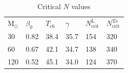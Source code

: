 \begin{table}
\centering
\caption{Critical $N$ values}
\begin{tabular}{llllll}
\hline\noalign{\smallskip}
${\mathrm M}_\odot$ & $\beta_{0}$ & $T_{\mathrm c6}$ & $\gamma$
& $N_{\mathrm{crit}}^{\mathrm L}$
& $N_{\mathrm{crit}}^{\mathrm{Te}}$\\ \noalign{\smallskip}
\hline
\noalign{\smallskip}
30 & 0.82 & 38.4 & 35.7 & 154 & 320 \\
60 & 0.67 & 42.1 & 34.7 & 138 & 340 \\ 120 & 0.52 & 45.1 & 34.0 & 124 & 370 \\ \hline
\end{tabular}
\end{table}


 


